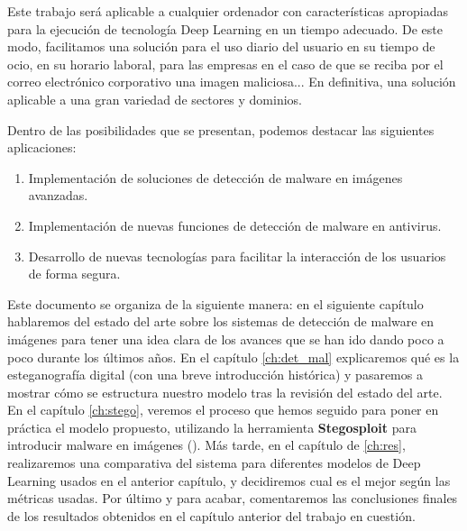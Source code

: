 Este trabajo será aplicable a cualquier ordenador con características apropiadas para la ejecución de tecnología Deep Learning en un tiempo adecuado. De este modo, facilitamos una solución para el uso diario del usuario en su tiempo de ocio, en su horario laboral, para las empresas en el caso de que se reciba por el correo electrónico corporativo una imagen maliciosa... En definitiva, una solución aplicable a una gran variedad de sectores y dominios. 

Dentro de las posibilidades que se presentan, podemos destacar las siguientes aplicaciones:
\begin{enumerate}
\item Implementación de soluciones de detección de malware en imágenes avanzadas.
\item Implementación de nuevas funciones de detección de malware en antivirus.
\item Desarrollo de nuevas tecnologías para facilitar la interacción de los usuarios de forma segura.
\end{enumerate}

Este documento se organiza de la siguiente manera: en el siguiente capítulo hablaremos del estado del arte sobre los sistemas de detección de malware en imágenes para tener una idea clara de los avances que se han ido dando poco a poco durante los últimos años. En el capítulo \ref{ch:det_mal} explicaremos qué es la esteganografía digital (con una breve introducción histórica) y pasaremos a mostrar cómo se estructura nuestro modelo tras la revisión del estado del arte. En el capítulo \ref{ch:stego}, veremos el proceso que hemos seguido para poner en práctica el modelo propuesto, utilizando la herramienta \textbf{Stegosploit} para introducir malware en imágenes (\cite{stegosploit}). Más tarde, en el capítulo de \ref{ch:res}, realizaremos una comparativa del sistema para diferentes modelos de Deep Learning usados en el anterior capítulo, y decidiremos cual es el mejor según las métricas usadas. Por último y para acabar, comentaremos las conclusiones finales de los resultados obtenidos en el capítulo anterior del trabajo en cuestión. %